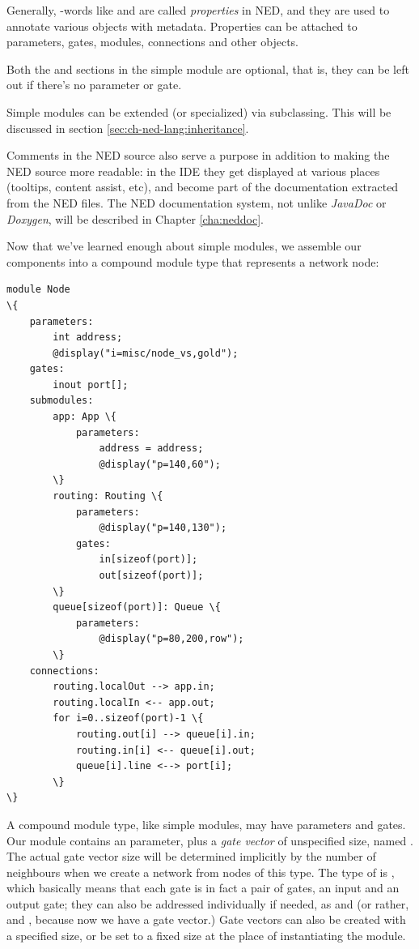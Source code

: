 Generally, -words like  and  are called
\textit{properties} in NED, and they are used to annotate various objects
with metadata. Properties can be attached to parameters, gates, modules,
connections and other objects.

Both the  and  sections in the simple module are
optional, that is, they can be left out if there's no parameter or gate.

Simple modules can be extended (or specialized) via subclassing. This will be
discussed in section \ref{sec:ch-ned-lang:inheritance}.

Comments in the NED source also serve a purpose in addition to making
the NED source more readable: in the {\opp} IDE they get displayed
at various places (tooltips, content assist, etc), and become part
of the documentation extracted from the NED files.
The NED documentation system, not unlike \textit{JavaDoc}
or \textit{Doxygen}, will be described in Chapter \ref{cha:neddoc}.

Now that we've learned enough about simple modules, we assemble our components
into a compound module type that represents a network node:

\begin{Verbatim}[commandchars=\\\{\}]
module Node
\{
    parameters:
        int address;
        @display("i=misc/node_vs,gold");
    gates:
        inout port[];
    submodules:
        app: App \{
            parameters:
                address = address;
                @display("p=140,60");
        \}
        routing: Routing \{
            parameters:
                @display("p=140,130");
            gates:
                in[sizeof(port)];
                out[sizeof(port)];
        \}
        queue[sizeof(port)]: Queue \{
            parameters:
                @display("p=80,200,row");
        \}
    connections:
        routing.localOut --> app.in;
        routing.localIn <-- app.out;
        for i=0..sizeof(port)-1 \{
            routing.out[i] --> queue[i].in;
            routing.in[i] <-- queue[i].out;
            queue[i].line <--> port[i];
        \}
\}
\end{Verbatim}

A compound module type, like simple modules, may have parameters and gates.
Our  module contains an  parameter, plus a
\textit{gate vector} of unspecified size, named .
The actual gate vector size will be determined implicitly by the number
of neighbours when we create a network from nodes of this type.
The type of  is , which basically means that
each gate is in fact a pair of gates, an input and an output gate;
they can also be addressed individually if needed, as  and
 (or rather,  and ,
because now we have a gate vector.) Gate vectors can also be created with
a specified size, or be set to a fixed size at the place
of instantiating the module.

